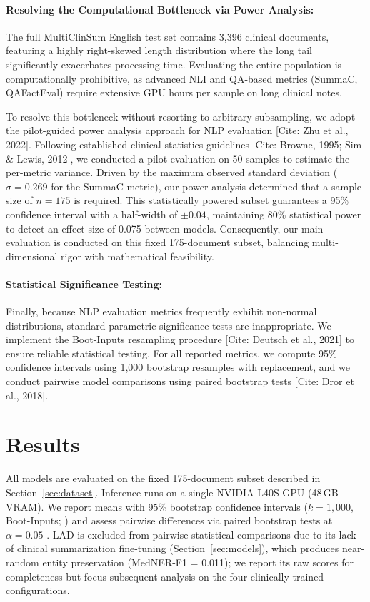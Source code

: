 \documentclass[11pt]{article}
\begin{document}
\paragraph{Resolving the Computational Bottleneck via Power Analysis:}
The full MultiClinSum English test set contains 3,396 clinical documents, featuring a highly right-skewed length distribution where the long tail significantly exacerbates processing time. Evaluating the entire population is computationally prohibitive, as advanced NLI and QA-based metrics (SummaC, QAFactEval) require extensive GPU hours per sample on long clinical notes.

To resolve this bottleneck without resorting to arbitrary subsampling, we adopt the pilot-guided power analysis approach for NLP evaluation [Cite: Zhu et al., 2022]. Following established clinical statistics guidelines [Cite: Browne, 1995; Sim \& Lewis, 2012], we conducted a pilot evaluation on 50 samples to estimate the per-metric variance. Driven by the maximum observed standard deviation ($\sigma = 0.269$ for the SummaC metric), our power analysis determined that a sample size of $n = 175$ is required. This statistically powered subset guarantees a 95\% confidence interval with a half-width of $\pm 0.04$, maintaining 80\% statistical power to detect an effect size of 0.075 between models. Consequently, our main evaluation is conducted on this fixed 175-document subset, balancing multi-dimensional rigor with mathematical feasibility.

\paragraph{Statistical Significance Testing:}
Finally, because NLP evaluation metrics frequently exhibit non-normal distributions, standard parametric significance tests are inappropriate. We implement the Boot-Inputs resampling procedure [Cite: Deutsch et al., 2021] to ensure reliable statistical testing. For all reported metrics, we compute 95\% confidence intervals using 1,000 bootstrap resamples with replacement, and we conduct pairwise model comparisons using paired bootstrap tests [Cite: Dror et al., 2018].


\section{Results}
\label{sec:results}

All models are evaluated on the fixed 175-document subset described in
Section~\ref{sec:dataset}. Inference runs on a single NVIDIA L40S GPU (48\,GB
VRAM). We report means with 95\% bootstrap confidence intervals
($k = 1{,}000$, Boot-Inputs; \cite{deutsch2021statistical}) and assess pairwise
differences via paired bootstrap tests at $\alpha = 0.05$
\citep{dror2018hitchhikers}. LAD is excluded from pairwise statistical
comparisons due to its lack of clinical summarization fine-tuning
(Section~\ref{sec:models}), which produces near-random entity preservation
(MedNER-F1 = 0.011); we report its raw scores for completeness but focus
subsequent analysis on the four clinically trained configurations.
\end{document}
